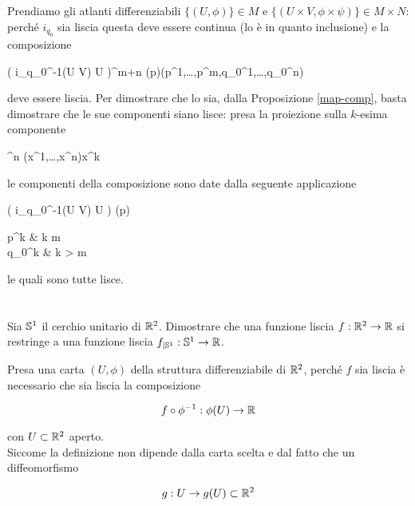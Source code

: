 Prendiamo gli atlanti differenziabili $ \{(U,\phi)\} \in M $ e $ \{(U \times V,\phi \times \psi)\} \in M \times N $: perché $ i_{q_{0}} $ sia liscia questa deve essere continua (lo è in quanto inclusione) e la composizione

%
	{\phi( i_{q_{0}}^{-1}(U \times V) \cap U )}{\R^{m+n}}%
	{\phi(p)}{(p^{1},\dots,p^{m},q_{0}^{1},\dots,q_{0}^{n})}

deve essere liscia. Per dimostrare che lo sia, dalla Proposizione \ref{map-comp}, basta dimostrare che le sue componenti siano lisce: presa la proiezione sulla $ k $-esima componente

%
	{\R^{n}}{\R}%
	{(x^{1},\dots,x^{n})}{x^{k}}
	
le componenti della composizione sono date dalla seguente applicazione

%
	{\phi( i_{q_{0}}^{-1}(U \times V) \cap U )}{\R}%
	{\phi(p)}{%
		\begin{cases}
			p^{k} & k \leqslant m\\
			q_{0}^{k} & k > m
		\end{cases}%
	}

le quali sono tutte lisce.

\tocless\section{}\label{es2-7}

\begin{tcolorbox}
	Sia $ \S^{1} $ il cerchio unitario di $ \R^{2} $. Dimostrare che una funzione liscia $ f : \R^{2} \to \R $ si restringe a una funzione liscia $ f_{|\S^{1}} : \S^{1} \to \R $.
\end{tcolorbox}

Presa una carta $ (U,\phi) $ della struttura differenziabile di $ \R^{2} $, perché $ f $ sia liscia è necessario che sia liscia la composizione

\begin{equation}
	f \circ \phi^{-1} : \phi(U) \to \R
\end{equation}

con $ U \subset \R^{2} $ aperto.\\
Siccome la definizione non dipende dalla carta scelta e dal fatto che un diffeomorfismo

\begin{equation}
	g : U \to g(U) \subset \R^{2}
\end{equation}

